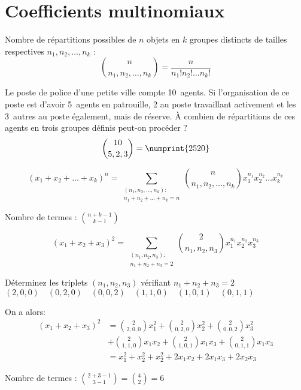 \section{Coefficients multinomiaux}

Nombre de répartitions possibles de $n$ objets en $k$ groupes distincts de tailles respectives $n_1, n_2,\dots, n_k$ :
\[\binom{n}{n_1,n_2,\dots,n_k} = \frac{n}{n_1!n_2!\dots n_k!}\]


 Le poste de police d’une petite ville compte 10~agents. Si l’organisation de ce poste est d’avoir 5~agents en patrouille, 2 au poste travaillant activement et les 3~autres au poste également, mais de réserve. À combien de répartitions de ces agents en trois groupes définis peut-on procéder ?
\[\binom{10}{5,2,3} = \numprint{2520}\]

\[(x_1 + x_2 + \dots + x_k)^n = \sum_{\substack{(n_1,n_2,\dots,n_k):\\n_1+n_2+\dots+n_k=n}} \binom{n}{n_1,n_2,\dots,n_k} x_1^{n_1} x_2^{n_2} \dots x_k^{n_k}\]

Nombre de termes : $\binom{n+k-1}{k-1}$

\[(x_1 + x_2 + x_3)^2 = \sum_{\substack{(n_1,n_2,n_3):\\n_1+n_2+n_3=2}} \binom{2}{n_1,n_2,n_3} x_1^{n_1} x_2^{n_2} x_3^{n_3}\]

\noindent Déterminez les triplets $(n_1, n_2, n_3)$ vérifiant $n_1 + n_2 + n_3 = 2$
$(2,0,0) \quad (0,2,0) \quad (0,0,2) \quad
 (1,1,0) \quad (1,0,1) \quad (0,1,1)$

\noindent On a alors:
\begin{align*}
	(x_1 + x_2 + x_3)^2 & = \binom{2}{2,0,0}x_1^2 + \binom{2}{0,2,0}x_2^2 + \binom{2}{0,0,2}x_3^2       \\
	                    & + \binom{2}{1,1,0}x_1 x_2 + \binom{2}{1,0,1}x_1 x_3 + \binom{2}{0,1,1}x_1 x_3 \\
	                    & = x_1^2 + x_2^2 + x_2^2 + 2 x_1 x_2 + 2 x_1 x_3 + 2 x_2 x_3
\end{align*}

Nombre de termes : $\binom{2+3-1}{3-1} = \binom{4}{2} = 6$